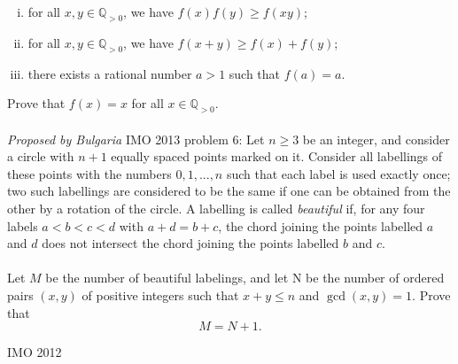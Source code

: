 \begin{enumerate}[(i)]
  \item for all $x,y\in\mathbb Q_{>0}$, we have $f(x)f(y)\geq f(xy)$;
  \item for all $x,y\in\mathbb Q_{>0}$, we have $f(x+y)\geq f(x)+f(y)$;
  \item there exists a rational number $a>1$ such that $f(a)=a$.
\end{enumerate}
Prove that $f(x)=x$ for all $x\in\mathbb Q_{>0}$. \\\\
\textit{Proposed by Bulgaria} 
IMO 2013 problem 6:  Let $n \ge 3$ be an integer, and consider a circle with $n + 1$ equally spaced points marked on it. Consider all labellings of these points with the numbers $0, 1, ... , n$ such that each label is used exactly once; two such labellings are considered to be the same if one can be obtained from the other by a rotation of the circle. A labelling is called \textit{beautiful} if, for any four labels $a < b < c < d$ with $a + d = b + c$, the chord joining the points labelled $a$ and $d$ does not intersect the chord joining the points labelled $b$ and $c$. \\\\
Let $M$ be the number of beautiful labelings, and let N be the number of ordered pairs $(x, y)$ of positive integers such that $x + y \le n$ and $\gcd(x, y) = 1$. Prove that
\[ M = N + 1. \] 

IMO 2012 

